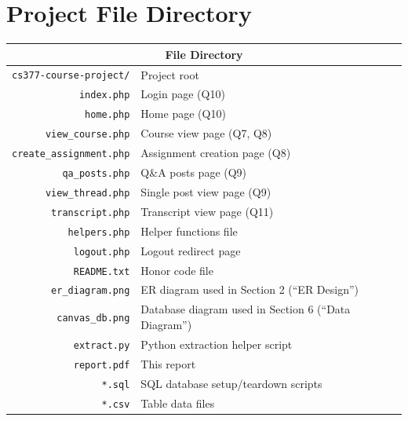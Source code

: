 \documentclass{paper}
\begin{document}
	\section{Project File Directory}
	\begin{center}
		\begin{tabular}{ r | l }
			\toprule
			\multicolumn{2}{c}{\textbf{File Directory}} \\
			\midrule
				\verb|cs377-course-project/| & Project root \\
				\verb|index.php| & Login page (Q10) \\
				\verb|home.php| & Home page (Q10) \\
				\verb|view_course.php| & Course view page (Q7, Q8) \\
				\verb|create_assignment.php| & Assignment creation page (Q8) \\
				\verb|qa_posts.php| & Q\&A posts page (Q9) \\
				\verb|view_thread.php| & Single post view page (Q9) \\
				\verb|transcript.php| & Transcript view page (Q11) \\
				\verb|helpers.php| & Helper functions file \\
				\verb|logout.php| & Logout redirect page \\
				\verb|README.txt| & Honor code file \\
				\verb|er_diagram.png| & ER diagram used in Section 2 (``ER Design'')\\
				\verb|canvas_db.png| & Database diagram used in Section 6 (``Data Diagram'')\\
				\verb|extract.py| & Python extraction helper script \\
				\verb|report.pdf| & This report \\
				\verb|*.sql| & SQL database setup/teardown scripts \\
				\verb|*.csv| & Table data files \\
			\bottomrule
		\end{tabular}
	\end{center}
	
\end{document}
